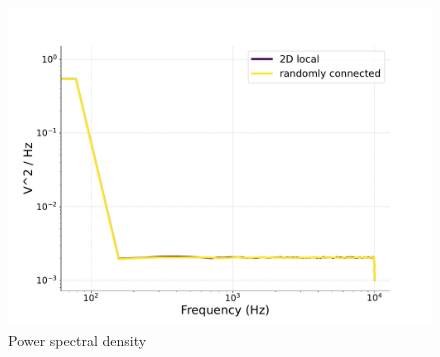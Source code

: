 \documentclass[a4paper,12pt]{article}
\begin{document}
\begin{figure}[H] 
    \centering
    \includegraphics[width=0.8\linewidth]{nu_ext_76PSD_homeostasis.pdf}
    \caption{Power spectral density}
    \label{charlie76PSD}
\end{figure}
\end{document}
